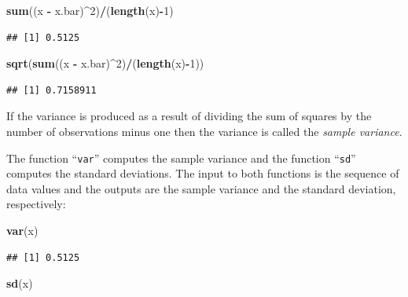 \documentclass[
]{krantz}
\makeatletter
\newenvironment{Shaded}{\begin{snugshade}}{\end{snugshade}}
\newcommand{\DecValTok}[1]{\textcolor[rgb]{0.00,0.00,0.81}{#1}}
\newcommand{\KeywordTok}[1]{\textcolor[rgb]{0.13,0.29,0.53}{\textbf{#1}}}
\newcommand{\NormalTok}[1]{#1}
\newcommand{\OperatorTok}[1]{\textcolor[rgb]{0.81,0.36,0.00}{\textbf{#1}}}
\newcommand{\StringTok}[1]{\textcolor[rgb]{0.31,0.60,0.02}{#1}}
\newenvironment{kframe}{%
\medskip{}
\setlength{\fboxsep}{.8em}
 \def\at@end@of@kframe{}%
 \ifinner\ifhmode%
  \def\at@end@of@kframe{\end{minipage}}%
  \begin{minipage}{\columnwidth}%
 \fi\fi%
 \def\FrameCommand##1{\hskip\@totalleftmargin \hskip-\fboxsep
 \colorbox{shadecolor}{##1}\hskip-\fboxsep
     \hskip-\linewidth \hskip-\@totalleftmargin \hskip\columnwidth}%
 \MakeFramed {\advance\hsize-\width
   \@totalleftmargin\z@ \linewidth\hsize
   \@setminipage}}%
 {\par\unskip\endMakeFramed%
 \at@end@of@kframe}
\renewenvironment{Shaded}{\begin{kframe}}{\end{kframe}}
\theoremstyle{definition}
\theoremstyle{definition}
\theoremstyle{definition}
\theoremstyle{remark}
\makeatother
\begin{document}
\begin{Shaded}
\begin{Highlighting}[]
\KeywordTok{sum}\NormalTok{((x }\OperatorTok{-}\StringTok{ }\NormalTok{x.bar)}\OperatorTok{^}\DecValTok{2}\NormalTok{)}\OperatorTok{/}\NormalTok{(}\KeywordTok{length}\NormalTok{(x)}\OperatorTok{-}\DecValTok{1}\NormalTok{)}
\end{Highlighting}
\end{Shaded}

\begin{verbatim}
## [1] 0.5125
\end{verbatim}

\begin{Shaded}
\begin{Highlighting}[]
\KeywordTok{sqrt}\NormalTok{(}\KeywordTok{sum}\NormalTok{((x }\OperatorTok{-}\StringTok{ }\NormalTok{x.bar)}\OperatorTok{^}\DecValTok{2}\NormalTok{)}\OperatorTok{/}\NormalTok{(}\KeywordTok{length}\NormalTok{(x)}\OperatorTok{-}\DecValTok{1}\NormalTok{))}
\end{Highlighting}
\end{Shaded}

\begin{verbatim}
## [1] 0.7158911
\end{verbatim}

If the variance is produced as a result of dividing the sum of squares
by the number of observations minus one then the variance is called the
\emph{sample variance}.

The function ``\texttt{var}'' computes the sample variance and the function
``\texttt{sd}'' computes the standard deviations. The input to both functions is
the sequence of data values and the outputs are the sample variance and
the standard deviation, respectively:

\begin{Shaded}
\begin{Highlighting}[]
\KeywordTok{var}\NormalTok{(x)}
\end{Highlighting}
\end{Shaded}

\begin{verbatim}
## [1] 0.5125
\end{verbatim}

\begin{Shaded}
\begin{Highlighting}[]
\KeywordTok{sd}\NormalTok{(x)}
\end{Highlighting}
\end{Shaded}
\end{document}
